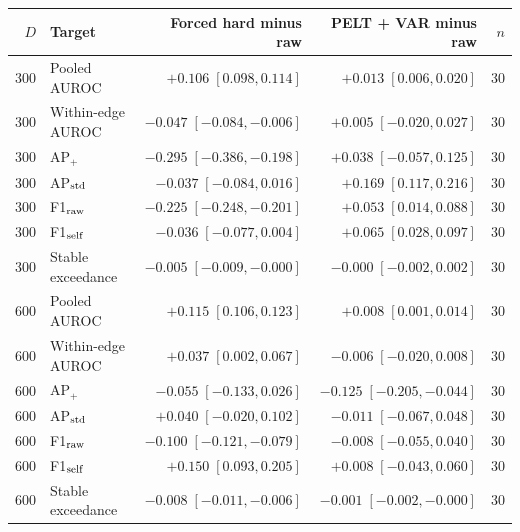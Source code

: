 \begin{tabular}{rlrrr}
\toprule
$D$ & Target & Forced hard minus raw & PELT + VAR minus raw & $n$ \\
\midrule
300 & Pooled AUROC & $+0.106\;[0.098,0.114]$ & $+0.013\;[0.006,0.020]$ & 30 \\
300 & Within-edge AUROC & $-0.047\;[-0.084,-0.006]$ & $+0.005\;[-0.020,0.027]$ & 30 \\
300 & AP$_+$ & $-0.295\;[-0.386,-0.198]$ & $+0.038\;[-0.057,0.125]$ & 30 \\
300 & AP$_{\rm std}$ & $-0.037\;[-0.084,0.016]$ & $+0.169\;[0.117,0.216]$ & 30 \\
300 & F1$_{\rm raw}$ & $-0.225\;[-0.248,-0.201]$ & $+0.053\;[0.014,0.088]$ & 30 \\
300 & F1$_{\rm self}$ & $-0.036\;[-0.077,0.004]$ & $+0.065\;[0.028,0.097]$ & 30 \\
300 & Stable exceedance & $-0.005\;[-0.009,-0.000]$ & $-0.000\;[-0.002,0.002]$ & 30 \\
600 & Pooled AUROC & $+0.115\;[0.106,0.123]$ & $+0.008\;[0.001,0.014]$ & 30 \\
600 & Within-edge AUROC & $+0.037\;[0.002,0.067]$ & $-0.006\;[-0.020,0.008]$ & 30 \\
600 & AP$_+$ & $-0.055\;[-0.133,0.026]$ & $-0.125\;[-0.205,-0.044]$ & 30 \\
600 & AP$_{\rm std}$ & $+0.040\;[-0.020,0.102]$ & $-0.011\;[-0.067,0.048]$ & 30 \\
600 & F1$_{\rm raw}$ & $-0.100\;[-0.121,-0.079]$ & $-0.008\;[-0.055,0.040]$ & 30 \\
600 & F1$_{\rm self}$ & $+0.150\;[0.093,0.205]$ & $+0.008\;[-0.043,0.060]$ & 30 \\
600 & Stable exceedance & $-0.008\;[-0.011,-0.006]$ & $-0.001\;[-0.002,-0.000]$ & 30 \\
\bottomrule
\end{tabular}

